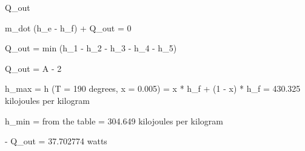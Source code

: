 Q_out

m_dot (h_e - h_f) + Q_out = 0

Q_out = min (h_1 - h_2 - h_3 - h_4 - h_5)

Q_out = A - 2

h_max = h (T = 190 degrees, x = 0.005) = x * h_f + (1 - x) * h_f = 430.325 kilojoules per kilogram

h_min = from the table = 304.649 kilojoules per kilogram

- Q_out = 37.702774 watts